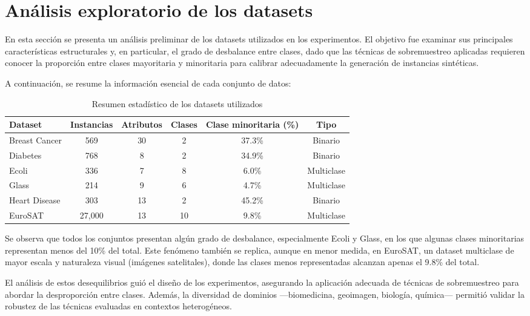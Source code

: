 \section{Análisis exploratorio de los datasets}

En esta sección se presenta un análisis preliminar de los datasets utilizados en los experimentos. El objetivo fue examinar sus principales características estructurales y, en particular, el grado de desbalance entre clases, dado que las técnicas de sobremuestreo aplicadas requieren conocer la proporción entre clases mayoritaria y minoritaria para calibrar adecuadamente la generación de instancias sintéticas.

A continuación, se resume la información esencial de cada conjunto de datos:

\begin{table}[H]
\centering
\caption{Resumen estadístico de los datasets utilizados}
\begin{tabularx}{\textwidth}{lccccc}
\toprule
\textbf{Dataset} & \textbf{Instancias} & \textbf{Atributos} & \textbf{Clases} & \textbf{Clase minoritaria (\%)} & \textbf{Tipo} \\
\midrule
Breast Cancer & 569 & 30 & 2 & 37.3\% & Binario \\
Diabetes & 768 & 8 & 2 & 34.9\% & Binario \\
Ecoli & 336 & 7 & 8 & 6.0\% & Multiclase \\
Glass & 214 & 9 & 6 & 4.7\% & Multiclase \\
Heart Disease & 303 & 13 & 2 & 45.2\% & Binario \\
EuroSAT & 27,000 & 13 & 10 & 9.8\% & Multiclase \\
\bottomrule
\end{tabularx}
\label{tab:resumen_datasets}
\end{table}

Se observa que todos los conjuntos presentan algún grado de desbalance, especialmente Ecoli y Glass, en los que algunas clases minoritarias representan menos del 10\% del total. Este fenómeno también se replica, aunque en menor medida, en EuroSAT, un dataset multiclase de mayor escala y naturaleza visual (imágenes satelitales), donde las clases menos representadas alcanzan apenas el 9.8\% del total.

El análisis de estos desequilibrios guió el diseño de los experimentos, asegurando la aplicación adecuada de técnicas de sobremuestreo para abordar la desproporción entre clases. Además, la diversidad de dominios —biomedicina, geoimagen, biología, química— permitió validar la robustez de las técnicas evaluadas en contextos heterogéneos.
